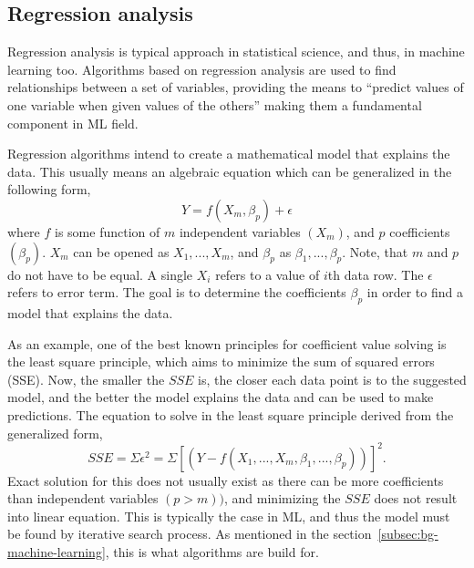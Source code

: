 
\subsection{Regression analysis}\label{subsec:bg-regression-ml}

Regression analysis is typical approach in statistical science,
and thus, in machine learning too.
Algorithms based on regression analysis
are used to find relationships between a set of variables,
providing the means to \enquote{predict values of one variable
when given values of the others}
making them a fundamental component in ML field.~\cite{merriam2022regression}

Regression algorithms intend to create a mathematical model
that explains the data.
This usually means an algebraic equation
which can be generalized in the following form,
\begin{equation}
    \label{eqn:general-regression-model}
    Y = f(X_{m},\beta_{p})+\epsilon
\end{equation}
where $f$ is some function of $m$ independent variables $(X_{m})$,
and $p$ coefficients $(\beta_{p})$.
$X_{m}$ can be opened as $X_{1},...,X_{m}$,
and $\beta_{p}$ as $\beta_{1},...,\beta_{p}$.
Note, that $m$ and $p$ do not have to be equal.
A single $X_{i}$ refers to a value of $i$th data row.
The $\epsilon$ refers to error term.
The goal is to determine the coefficients $\beta_{p}$
in order to find a model that explains the data.~\cite{freund2006regression}

As an example,
one of the best known principles for coefficient value solving
is the least square principle,
which aims to minimize the sum of squared errors (SSE).
Now,
the smaller the $SSE$ is,
the closer each data point is to the suggested model,
and the better the model explains the data
and can be used to make predictions.
The equation to solve in the least square principle
derived from the generalized form,
\begin{equation}
    \label{eqn:sum-of-squared-errors}
    SSE = \Sigma\epsilon^{2} = \Sigma[(Y-f(X_{1},...,X_{m},\beta_{1},...,\beta_{p}))]^{2}.
\end{equation}
Exact solution for this does not usually exist
as there can be more coefficients than independent variables $(p>m))$,
and minimizing the $SSE$ does not result into linear equation.
This is typically the case in ML,
and thus the model must be found
by iterative search process.
As mentioned in the section~\ref{subsec:bg-machine-learning},
this is what algorithms are build for.

